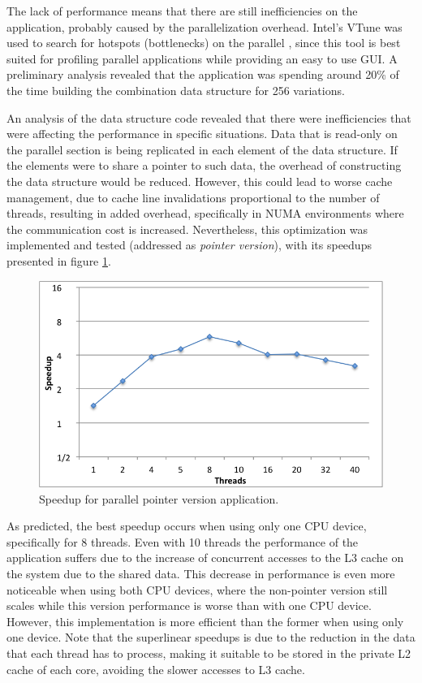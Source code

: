 The lack of performance means that there are still inefficiencies on the application, probably caused by the parallelization overhead. Intel's VTune was used to search for hotspots (bottlenecks) on the parallel \tth, since this tool is best suited for profiling parallel applications while providing an easy to use GUI. A preliminary analysis revealed that the application was spending around 20\% of the time building the combination data structure for 256 variations.

An analysis of the data structure code revealed that there were inefficiencies that were affecting the performance in specific situations. Data that is read-only on the parallel section is being replicated in each element of the data structure. If the elements were to share a pointer to such data, the overhead of constructing the data structure would be reduced. However, this could lead to worse cache management, due to cache line invalidations proportional to the number of threads, resulting in added overhead, specifically in NUMA environments where the communication cost is increased. Nevertheless, this optimization was implemented and tested (addressed as \textit{pointer version}), with its speedups presented in figure \ref{fig:pointer_speedup}.

\begin{figure}[!htp]
	\begin{center}
		\includegraphics[scale=0.4]{charts/speedup_pointer_omp.png}
		\caption{Speedup for \tth parallel pointer version application.}
		\label{fig:pointer_speedup}
	\end{center}
\end{figure}

As predicted, the best speedup occurs when using only one CPU device, specifically for 8 threads. Even with 10 threads the performance of the application suffers due to the increase of concurrent accesses to the L3 cache on the system due to the shared data. This decrease in performance is even more noticeable when using both CPU devices, where the non-pointer version still scales while this version performance is worse than with one CPU device. However, this implementation is more efficient than the former when using only one device. Note that the superlinear speedups is due to the reduction in the data that each thread has to process, making it suitable to be stored in the private L2 cache of each core, avoiding the slower accesses to L3 cache.
